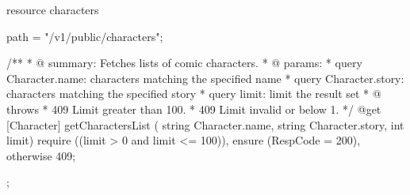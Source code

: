 resource characters  { 
     path = "/v1/public/characters"; 
    
      /**
      * @ summary: Fetches lists of comic characters.
      * @ params:
      *       query Character.name: characters matching the specified name
      *       query Character.story: characters matching the specified story
      *       query limit: limit the result set 
      * @ throws
      *       409  Limit greater than 100.
      *       409  Limit invalid or below 1.
      */
      @get    [Character] getCharactersList ( string Character.name, string Character.story,
                           	                 int limit)
           require ((limit > 0 and limit <= 100)),
           ensure (RespCode = 200),
           otherwise 409;
     
 };
